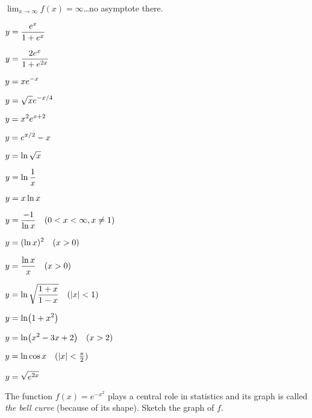 \begin{multicols}{2}
$\lim_{x\to\infty}f(x) = \infty$\ldots no asymptote there.
\endanswer




\problem $\displaystyle y= \frac{e^x}{1+e^x} $ %




\problem $\displaystyle y= \frac{2e^x}{1+e^{2x}} $ %




\problem $\displaystyle y= xe^{-x} $ %




\problem $\displaystyle y= \sqrt{x}e^{-x/4} $ %




\problem $\displaystyle y= x^2 e^{x+2} $ %




\problem $\displaystyle y= e^{x/2}-x$ %




\problem $\displaystyle y= \ln \sqrt x $ %




\problem $\displaystyle y= \ln \frac1 x $ %




\problem $\displaystyle y= x\ln x $ %




\problem $\displaystyle y= \frac{-1}{\ln x}  \quad(0<x<\infty, x\neq1)$ %




\problem $\displaystyle y= (\ln x)^2  \quad(x>0)$ %




\problem $\displaystyle y= \frac{\ln x}{x} \quad(x>0)$ %




\problem $\displaystyle y=\ln \sqrt{\frac{1+x}{1-x}} \quad(|x|<1)$ %




\problem $\displaystyle y= \ln \bigl(1+x^2\bigr) $ %




\problem $\displaystyle y= \ln \bigl(x^2-3x+2\bigr) \quad (x>2) $ %




\problem $\displaystyle y= \ln\cos x\quad (|x|< \tfrac{\pi}{2})$ %




\problem $\displaystyle y = \sqrt{e^{2x}}$ %




\problem The function $f(x) = e^{-x^2}$ plays a central role in %
statistics and its graph is called \emph{the bell curve} (because of its
shape).  Sketch the graph of $f$.





\end{multicols}
